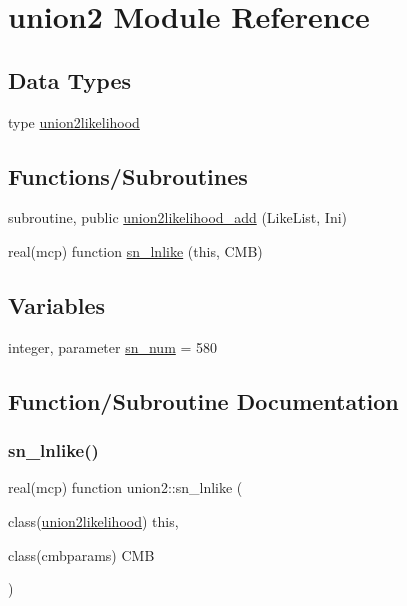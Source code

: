 \hypertarget{namespaceunion2}{}\section{union2 Module Reference}
\label{namespaceunion2}
\subsection*{Data Types}
\begin{DoxyCompactItemize}
\item 
type \mbox{\hyperlink{structunion2_1_1union2likelihood}{union2likelihood}}
\end{DoxyCompactItemize}
\subsection*{Functions/\+Subroutines}
\begin{DoxyCompactItemize}
\item 
subroutine, public \mbox{\hyperlink{namespaceunion2_a1a2bf6931cf4fb87b54c8c327d598f48}{union2likelihood\+\_\+add}} (Like\+List, Ini)
\item 
real(mcp) function \mbox{\hyperlink{namespaceunion2_a250c916120b646c5cda938be6828a432}{sn\+\_\+lnlike}} (this, C\+MB)
\end{DoxyCompactItemize}
\subsection*{Variables}
\begin{DoxyCompactItemize}
\item 
integer, parameter \mbox{\hyperlink{namespaceunion2_a263e630a36e6cdb0d23c6982c2d13b8e}{sn\+\_\+num}} = 580
\end{DoxyCompactItemize}


\subsection{Function/\+Subroutine Documentation}
\mbox{\label{namespaceunion2_a250c916120b646c5cda938be6828a432}} 
\subsubsection{\texorpdfstring{sn\+\_\+lnlike()}{sn\_lnlike()}}
{\footnotesize\ttfamily real(mcp) function union2\+::sn\+\_\+lnlike (\begin{DoxyParamCaption}\item[{class(\mbox{\hyperlink{structunion2_1_1union2likelihood}{union2likelihood}})}]{this,  }\item[{class(cmbparams)}]{C\+MB }\end{DoxyParamCaption})\hspace{0.3cm}{\ttfamily [private]}}



